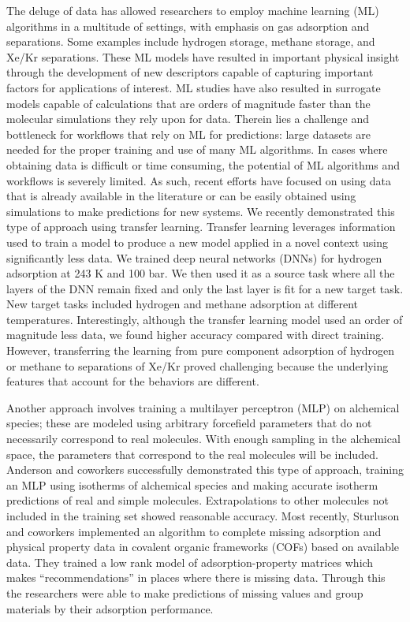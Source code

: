 \documentclass[twoside,twocolumn,9pt]{article}
\begin{document}
The deluge of data has allowed researchers to employ machine learning (ML) algorithms in a multitude of settings, with emphasis on gas adsorption and separations.\cite{Krish,ml_shi,co2_fer,agaji,Chung_ml_co2} Some examples include hydrogen storage, methane storage, and Xe/Kr separations.\cite{h2_ml,bobbitt,methane_ml,ML_methane_fanour,xekr} These ML models have resulted in important physical insight through the development of new descriptors capable of capturing important factors for applications of interest.\cite{geometrical,rapid_ML_co2,energy-based-descriptor,eigen_cages}  ML studies have also resulted in surrogate models capable of calculations that are orders of magnitude faster than the molecular simulations they rely upon for data.\cite{befort2021machine} Therein lies a challenge and bottleneck for workflows that rely on ML for predictions: large datasets are needed for the proper training and use of many ML algorithms. In cases where obtaining data is difficult or time consuming, the potential of ML algorithms and workflows is severely limited.
As such, recent efforts have focused on using data that is already available in the literature or can be easily obtained using simulations to make predictions for new systems. We recently demonstrated this type of approach using transfer learning.\cite{TL_colon} Transfer learning leverages information used to train a model to produce a new model applied in a novel context using significantly less data. We trained deep neural networks (DNNs) for hydrogen adsorption at 243 K and 100 bar. We then used it as a source task where all the layers of the DNN remain fixed and only the last layer is fit for a new target task. New target tasks included hydrogen and methane adsorption at different temperatures. Interestingly, although the transfer learning model used an order of magnitude less data, we found higher accuracy compared with direct training. However, transferring the learning from pure component adsorption of hydrogen or methane to separations of Xe/Kr proved challenging because the underlying features that account for the behaviors are different. 

Another approach involves training a multilayer perceptron (MLP) on alchemical species; these are modeled using arbitrary forcefield parameters that do not necessarily correspond to real molecules. With enough sampling in the alchemical space, the parameters that correspond to the real molecules will be included. Anderson and coworkers successfully demonstrated this type of approach, training an MLP using isotherms of alchemical species and making accurate isotherm predictions of real and simple molecules.\cite{anderson} Extrapolations to other molecules not included in the training set showed reasonable accuracy.  Most recently, Sturluson and coworkers implemented an algorithm to complete missing adsorption and physical property data in covalent organic frameworks (COFs) based on available data.\cite{arni_cofs} They trained a low rank model of adsorption-property matrices which makes ``recommendations'' in places where there is missing data. Through this the researchers were able to make predictions of missing values and group materials by their adsorption performance.
	
\end{document}
